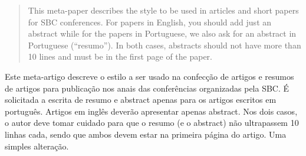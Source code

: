 \begin{abstract}
    This meta-paper describes the style to be used in articles and short papers
    for SBC conferences. For papers in English, you should add just an abstract
    while for the papers in Portuguese, we also ask for an abstract in
    Portuguese (``resumo''). In both cases, abstracts should not have more than
    10 lines and must be in the first page of the paper.
  \end{abstract}
       
  \begin{resumo} 
    Este meta-artigo descreve o estilo a ser usado na confecção de artigos e
    resumos de artigos para publicação nos anais das conferências organizadas
    pela SBC. É solicitada a escrita de resumo e abstract apenas para os artigos
    escritos em português. Artigos em inglês deverão apresentar apenas abstract.
    Nos dois casos, o autor deve tomar cuidado para que o resumo (e o abstract)
    não ultrapassem 10 linhas cada, sendo que ambos devem estar na primeira
    página do artigo. Uma simples alteração.
  \end{resumo}
